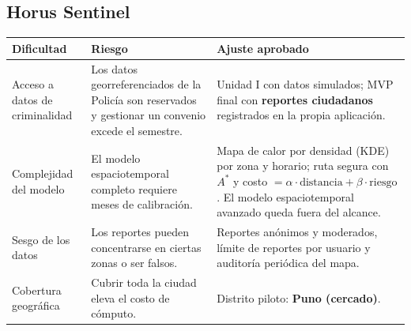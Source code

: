 \documentclass[11pt,a4paper]{article}
\begin{document}
\subsection{Horus Sentinel}
{\small
\noindent\begin{tabularx}{\textwidth}{@{}P{3.8cm} L L@{}}
\toprule
{}
\textbf{Dificultad} & \textbf{Riesgo} & \textbf{Ajuste aprobado} \\
\midrule
Acceso a datos de criminalidad & Los datos georreferenciados de la Policía son reservados y gestionar un convenio excede el semestre. & Unidad I con datos simulados; MVP final con \textbf{reportes ciudadanos} registrados en la propia aplicación. \\
\addlinespace[2pt]
Complejidad del modelo & El modelo espaciotemporal completo requiere meses de calibración. & Mapa de calor por densidad (KDE) por zona y horario; ruta segura con $A^*$ y costo $= \alpha \cdot \text{distancia} + \beta \cdot \text{riesgo}$. El modelo espaciotemporal avanzado queda fuera del alcance. \\
\addlinespace[2pt]
Sesgo de los datos & Los reportes pueden concentrarse en ciertas zonas o ser falsos. & Reportes anónimos y moderados, límite de reportes por usuario y auditoría periódica del mapa. \\
\addlinespace[2pt]
Cobertura geográfica & Cubrir toda la ciudad eleva el costo de cómputo. & Distrito piloto: \textbf{Puno (cercado)}. \\
\bottomrule
\end{tabularx}
}

\end{document}
